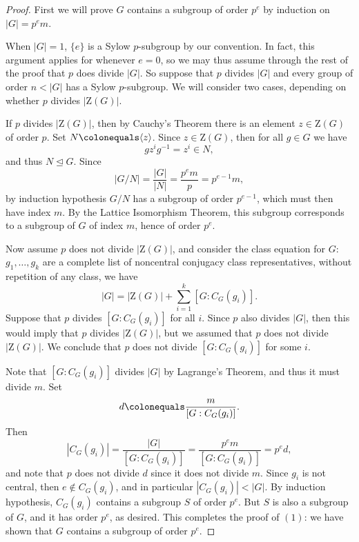 \documentclass[12pt]{report}
\numberwithin{equation}{section}
\numberwithin{theorem}{chapter}
\theoremstyle{definition}
\newtheorem*{basic properties}{Basic Properties}
\newtheorem*{Important Remark}{Important Remark}
\begin{document}
\begin{proof}
First we will prove $G$ contains a subgroup of order $p^e$ by induction on $|G| = p^em$. 

When $|G| = 1$, $\{e\}$ is a Sylow $p$-subgroup by our convention. In fact, this argument applies for whenever $e = 0$, so we may thus assume through the rest of the proof that $p$ does divide $|G|$. 
So suppose that $p$ divides $|G|$ and every group of order $n < |G|$ has a Sylow $p$-subgroup. We will consider two cases, depending on whether $p$ divides $|\mathrm{Z}(G)|$. 

If $p$ divides $|\mathrm{Z}(G)|$, then by Cauchy's Theorem there is an element $z \in \mathrm{Z}(G)$ of order $p$. Set $N \colonequals \langle z \rangle$. Since $z \in \mathrm{Z}(G)$, then for all $g \in G$ we have
$$gz^ig^{-1} = z^i \in N,$$
and thus $N \trianglelefteq G$. 
Since 
$$|G/N| = \frac{|G|}{|N|} = \frac{p^em}{p} = p^{e-1}m,$$ 
by induction hypothesis $G/N$ has a subgroup of order $p^{e-1}$, which must then have index $m$. By the Lattice Isomorphism Theorem, this subgroup corresponds to a subgroup of $G$ of index $m$, hence of order $p^e$.

Now assume $p$ does not divide $|\mathrm{Z}(G)|$, and consider the class equation for $G$: $g_1, \dots, g_k$ are a complete list of noncentral conjugacy class representatives, without repetition of any class, we have
$$|G| = |\mathrm{Z}(G)| + \sum_{i=1}^k [G: C_G(g_i)].$$
Suppose that $p$ divides $[G:C_G(g_i)]$ for all $i$. Since $p$ also divides $|G|$, then this would imply that $p$ divides $|\mathrm{Z}(G)|$, but we assumed that $p$ does not divide $|\mathrm{Z}(G)|$. We conclude that $p$ does not divide $[G:C_G(g_i)]$ for some $i$. 

Note that $[G:C_G(g_i)]$ divides $|G|$ by Lagrange's Theorem, and thus it must divide $m$. Set 
$$d \colonequals \frac{m}{[G:C_G(g_i)]}.$$ 
Then
$$|C_G(g_i)|= \frac{|G|}{[G:C_G(g_i)]} = \frac{p^em}{[G:C_G(g_i)]} = p^e d,$$ 
and note that $p$ does not divide $d$ since it does not divide $m$. Since $g_i$ is not central, then $e \notin C_G(g_i)$, and in particular $|C_G(g_i)| < |G|$. By induction hypothesis, $C_G(g_i)$ contains a subgroup $S$ of order $p^e$. But $S$ is also a subgroup of $G$, and it has order $p^e$, as desired.
This completes the proof of $(1)$: we have shown that $G$ contains a subgroup of order $p^e$.


\vspace{1em}



\end{proof}
\end{document}
